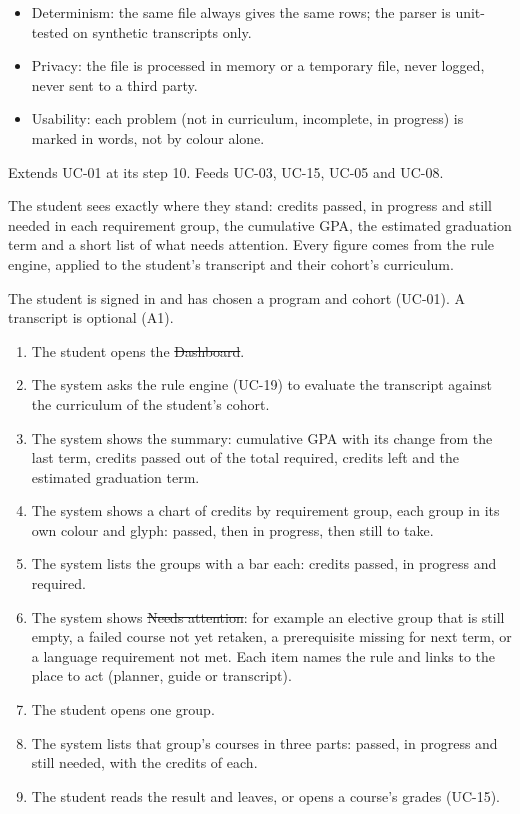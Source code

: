 \begin{itemize}
  \item Determinism: the same file always gives the same rows; the parser is unit-tested on synthetic transcripts only.
  \item Privacy: the file is processed in memory or a temporary file, never logged, never sent to a third party.
  \item Usability: each problem (not in curriculum, incomplete, in progress) is marked in words, not by colour alone.
\end{itemize}

Extends UC-01 at its step 10. Feeds UC-03, UC-15, UC-05 and UC-08.


The student sees exactly where they stand: credits passed, in progress and still needed in each requirement group, the
cumulative GPA, the estimated graduation term and a short list of what needs attention. Every figure comes from the rule
engine, applied to the student's transcript and their cohort's curriculum.

The student is signed in and has chosen a program and cohort (UC-01). A transcript is optional (A1).

\begin{enumerate}
  \item The student opens the \st{Dashboard}.
  \item The system asks the rule engine (UC-19) to evaluate the transcript against the curriculum of the student's
        cohort.
  \item The system shows the summary: cumulative GPA with its change from the last term, credits passed out of the
        total required, credits left and the estimated graduation term.
  \item The system shows a chart of credits by requirement group, each group in its own colour and glyph: passed, then in
        progress, then still to take.
  \item The system lists the groups with a bar each: credits passed, in progress and required.
  \item The system shows \st{Needs attention}: for example an elective group that is still empty, a failed course not yet
        retaken, a prerequisite missing for next term, or a language requirement not met. Each item names the rule and
        links to the place to act (planner, guide or transcript).
  \item The student opens one group.
  \item The system lists that group's courses in three parts: passed, in progress and still needed, with the credits of
        each.
  \item The student reads the result and leaves, or opens a course's grades (UC-15).
\end{enumerate}

